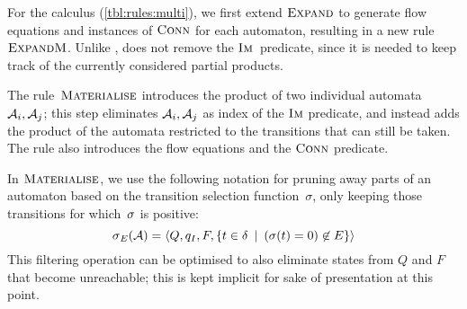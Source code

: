 \begin{table}[t]
    \end{table}

    For the calculus (\cref{tbl:rules:multi}), we first extend
    $\textsc{Expand}$ to generate flow equations and instances of $\operatorname{\textsc{Conn}}$
    for each automaton, resulting in a new rule $\textsc{ExpandM}$.  Unlike
    \Expand{}, \ExpandM{} does not remove the $\operatorname{\textsc{Im}}$~predicate,
    since it is needed to keep track of the currently considered
    partial products.


The rule~$\textsc{Materialise}$ introduces the product of two individual
automata~$\mathcal{A}_i, \mathcal{A}_j$; this step eliminates
$\mathcal{A}_i, \mathcal{A}_j$ as index of the $\operatorname{\textsc{Im}}$ predicate, and
instead adds the product of the automata restricted to the
transitions that can still be taken. The rule
also introduces the flow equations and the $\operatorname{\textsc{Conn}}$ predicate.

In $\textsc{Materialise}$, we use the following notation for pruning away
parts of an automaton based on the transition selection
function~$\sigma$, only keeping those transitions for which~$\operatorname{\sigma}$
is positive:
\begin{equation*}
  \operatorname{\sigma}_{E}(\mathcal{A}) =
  \left\langle Q, q_I, F,
\left\{t \in \delta \:\mid\: (\operatorname{\sigma}(t) = 0) \not\in E\right\}\right\rangle
\end{equation*}
This filtering operation can be optimised to also eliminate states from
$Q$ and $F$ that become unreachable; this is kept implicit for sake of
presentation at this point.

